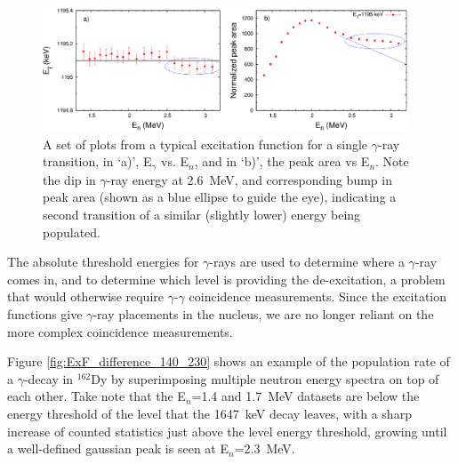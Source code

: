 \begin{figure}[h!]
\begin{center}
\includegraphics[width=0.97\textwidth]{figures/sample_exf.eps}
\caption{A set of plots from a typical excitation function for a single $\gamma$-ray transition, in `a)', E$_\gamma$ vs. E$_n$, and in `b)', the peak area vs E$_n$. Note the dip in $\gamma$-ray energy at 2.6~MeV, and corresponding bump in peak area (shown as a blue ellipse to guide the eye), indicating a second transition of a similar (slightly lower) energy being populated.
\label{fig:sample_exf}}
\end{center}
\end{figure}

The absolute threshold energies for $\gamma$-rays are used to determine where a $\gamma$-ray comes in, and to determine which level is providing the de-excitation, a problem that would otherwise require $\gamma$-$\gamma$ coincidence measurements. Since the excitation functions give $\gamma$-ray placements in the nucleus, we are no longer reliant on the more complex coincidence measurements. 

Figure \ref{fig:ExF_difference_140_230} shows an example of the population rate of a $\gamma$-decay in $^{162}$Dy by superimposing multiple neutron energy spectra on top of each other. Take note that the E$_n$=1.4 and 1.7~MeV datasets are below the energy threshold of the level that the 1647~keV decay leaves, with a sharp increase of counted statistics just above the level energy threshold, growing until a well-defined gaussian peak is seen at E$_n$=2.3~MeV.

